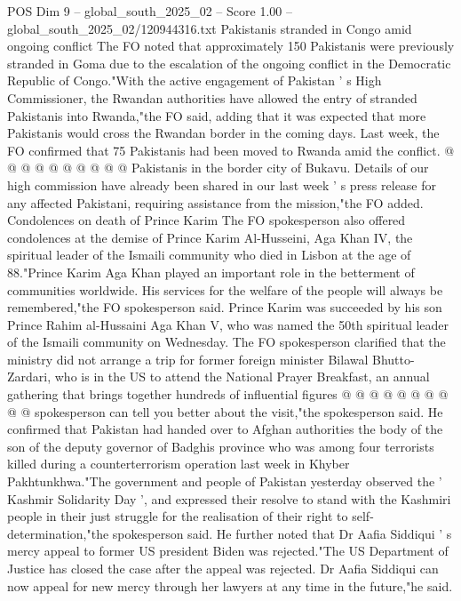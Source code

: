 \begin{textsample}{POS Dim 9 – global\_south\_2025\_02 – Score 1.00 – global\_south\_2025\_02/120944316.txt}
Pakistanis stranded in Congo amid ongoing conflict The FO noted that approximately 150 Pakistanis were previously stranded in Goma due to the escalation of the ongoing conflict in the Democratic Republic of Congo."With the active engagement of Pakistan ' s High Commissioner, the Rwandan authorities have allowed the entry of stranded Pakistanis into Rwanda,"the FO said, adding that it was expected that more Pakistanis would cross the Rwandan border in the coming days.
Last week, the FO confirmed that 75 Pakistanis had been moved to Rwanda amid the conflict. @ @ @ @ @ @ @ @ @ @ Pakistanis in the border city of Bukavu.
Details of our high commission have already been shared in our last week ' s press release for any affected Pakistani, requiring assistance from the mission,"the FO added.
Condolences on death of Prince Karim The FO spokesperson also offered condolences at the demise of Prince Karim Al-Husseini, Aga Khan IV, the spiritual leader of the Ismaili community who died in Lisbon at the age of 88."Prince Karim Aga Khan played an important role in the betterment of communities worldwide.
His services for the welfare of the people will always be remembered,"the FO spokesperson said.
Prince Karim was succeeded by his son Prince Rahim al-Hussaini Aga Khan V, who was named the 50th spiritual leader of the Ismaili community on Wednesday.
The FO spokesperson clarified that the ministry did not arrange a trip for former foreign minister Bilawal Bhutto-Zardari, who is in the US to attend the National Prayer Breakfast, an annual gathering that brings together hundreds of influential figures @ @ @ @ @ @ @ @ @ @ spokesperson can tell you better about the visit,"the spokesperson said.
He confirmed that Pakistan had handed over to Afghan authorities the body of the son of the deputy governor of Badghis province who was among four terrorists killed during a counterterrorism operation last week in Khyber Pakhtunkhwa."The government and people of Pakistan yesterday observed the ' Kashmir Solidarity Day ', and expressed their resolve to stand with the Kashmiri people in their just struggle for the realisation of their right to self-determination,"the spokesperson said.
He further noted that Dr Aafia Siddiqui ' s mercy appeal to former US president Biden was rejected."The US Department of Justice has closed the case after the appeal was rejected.
Dr Aafia Siddiqui can now appeal for new mercy through her lawyers at any time in the future,"he said.

\end{textsample}
